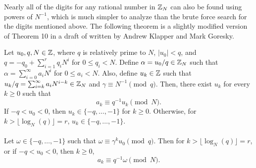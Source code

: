 \par Nearly all of the digits for any rational number in $\mathbb{Z}_N$ can also be
found using powers of $N^{-1}$, which is much simpler to analyze than the
brute force search for the digits mentioned above. The following theorem is a
slightly modified version of Theorem 10 in a draft of \cite{bk:gk12} written
by Andrew Klapper and Mark Goresky.

\begin{theorem}\label{thm:10}
  Let $u_0,q,N\in\mathbb{Z}$, where $q$ is relatively prime to $N$,
  $\lvert u_0 \rvert < q$, and $q=-q_0+\sum_{i=1}^{r}q_iN^i$ for
  $0 \leq q_i < N$. Define $\alpha = u_0/q \in \mathbb{Z}_N$
  such that $\alpha = \sum_{i=0}^{\infty}a_iN^i$ for $0 \leq a_i < N$.
  Also, define $u_k\in\mathbb{Z}$ such that $u_k/q =
  \sum_{i=k}^{\infty}a_iN^{i-k} \in \mathbb{Z}_N$ and
  $\gamma \equiv N^{-1} \pmod q$. Then, there exist $u_k$ for every $k\geq0$
  such that
  \begin{equation}\label{eq:ak}
    a_k \equiv q^{-1}u_k \pmod N.
  \end{equation}
  If $-q<u_0<0$, then $u_k \in \{-q,\dots,-1\}$ for $k\geq0$.  Otherwise,
  for $k>\lfloor \log_N(q) \rfloor=r$, $u_k \in \{-q,\dots,-1\}$.
  \\ \\
  Let $\omega \in \{-q,\dots,-1\}$ such that $\omega \equiv
  \gamma^k u_0 \pmod q$.  Then for $k>\lfloor \log_N(q) \rfloor=r$, or if
  $-q<u_0<0$, then $k\geq0$,
  \begin{equation}\label{eq:ak-omega}
    a_k \equiv q^{-1}\omega \pmod N.
  \end{equation}
\end{theorem}
\noindent \\ 
